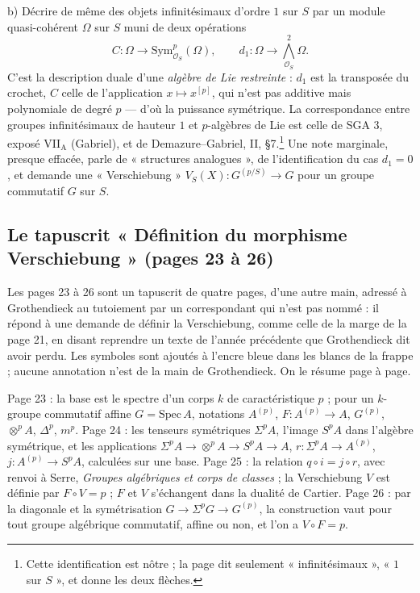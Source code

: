 \documentclass[11pt,a4paper]{article}
\begin{document}
b) Décrire de même des objets infinitésimaux d'ordre $1$ sur $S$ par un
module quasi-cohérent $\Omega$ sur $S$ muni de deux opérations
\[
C : \Omega \to \mathrm{Sym}^{p}_{\mathcal{O}_S}(\Omega), \qquad
d_1 : \Omega \to {\textstyle\bigwedge}^{2}_{\mathcal{O}_S}\Omega .
\]
C'est la description duale d'une \emph{algèbre de Lie restreinte} : $d_1$ est
la transposée du crochet, $C$ celle de l'application $x \mapsto x^{[p]}$, qui
n'est pas additive mais polynomiale de degré $p$ — d'où la puissance
symétrique. La correspondance entre groupes infinitésimaux de hauteur $1$
et $p$-algèbres de Lie est celle de SGA 3, exposé VII$_{\mathrm{A}}$
(Gabriel), et de Demazure–Gabriel, II, §7.\footnote{Cette identification est
nôtre ; la page dit seulement « infinitésimaux », « $1$ sur $S$ », et donne
les deux flèches.} Une note marginale, presque effacée, parle de
« structures analogues », de l'identification du cas $d_1 = 0$, et demande
une « Verschiebung » $V_S(X) : G^{(p/S)} \to G$ pour un groupe commutatif $G$
sur $S$.

\subsection*{Le tapuscrit « Définition du morphisme Verschiebung » (pages 23 à 26)}

Les pages 23 à 26 sont un tapuscrit de quatre pages, d'une autre main, adressé
à Grothendieck au tutoiement par un correspondant qui n'est pas nommé : il
répond à une demande de définir la Verschiebung, comme celle de la marge de la
page 21, en disant reprendre un texte de l'année précédente que Grothendieck
dit avoir perdu. Les symboles sont ajoutés à l'encre bleue dans les blancs de
la frappe ; aucune annotation n'est de la main de Grothendieck. On le résume
page à page.

Page 23 : la base est le spectre d'un corps $k$ de caractéristique $p$ ; pour
un $k$-groupe commutatif affine $G = \mathrm{Spec}\,A$, notations $A^{(p)}$,
$F : A^{(p)} \to A$, $G^{(p)}$, $\otimes^{p}A$, $\Delta^{p}$, $m^{p}$. Page 24 :
les tenseurs symétriques $\Sigma^{p}A$, l'image $S^{p}A$ dans l'algèbre
symétrique, et les applications $\Sigma^{p}A \to \otimes^{p}A \to S^{p}A \to A$,
$r : \Sigma^{p}A \to A^{(p)}$, $j : A^{(p)} \to S^{p}A$, calculées sur une base.
Page 25 : la relation $q \circ i = j \circ r$, avec renvoi à Serre,
\emph{Groupes algébriques et corps de classes} ; la Verschiebung $V$ est
définie par $F \circ V = p$ ; $F$ et $V$ s'échangent dans la dualité de
Cartier. Page 26 : par la diagonale et la symétrisation $G \to \Sigma^{p}G \to
G^{(p)}$, la construction vaut pour tout groupe algébrique commutatif, affine
ou non, et l'on a $V \circ F = p$.
\end{document}
